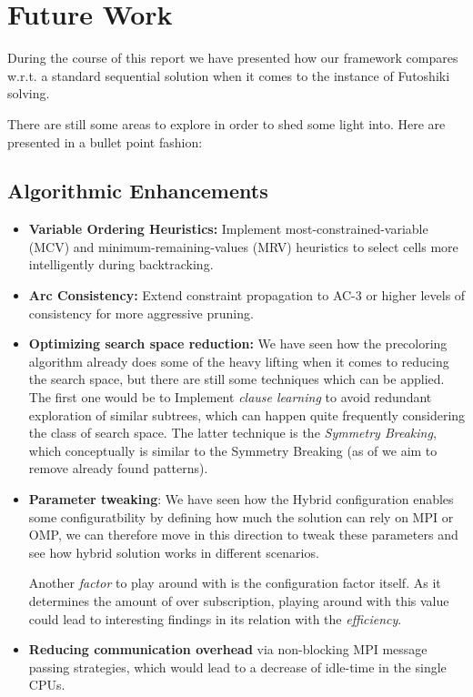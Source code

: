 \section{Future Work}
\label{sec:future_work}
During the course of this report we have presented how our framework compares w.r.t. a standard sequential solution when it comes to the instance of Futoshiki solving. 

There are still some areas to explore in order to shed some light into. Here are presented in a bullet point fashion:

\subsection{Algorithmic Enhancements}
\begin{itemize}
    \item \textbf{Variable Ordering Heuristics:} Implement most-constrained-variable (MCV) and minimum-remaining-values (MRV) heuristics to select cells more intelligently during backtracking.
    
    \item \textbf{Arc Consistency:} Extend constraint propagation to AC-3 or higher levels of consistency for more aggressive pruning.
    
    \item \textbf{Optimizing search space reduction:} We have seen how the precoloring algorithm already does some of the heavy lifting when it comes to reducing the search space, but there are still some techniques which can be applied. The first one would be to  Implement \textit{clause learning} to avoid redundant exploration of similar subtrees, which can happen quite frequently considering the class of search space. The latter technique is the \textit{Symmetry Breaking}, which conceptually is similar to the Symmetry Breaking (as of we aim to remove already found patterns).
    
    \item \textbf{Parameter tweaking}: We have seen how the Hybrid configuration enables some configuratbility by defining how much the solution can rely on MPI or OMP, we can therefore move in this direction to tweak these parameters and see how hybrid solution works in different scenarios.

    Another \textit{factor }to play around with is the configuration factor itself. As it determines the amount of over subscription, playing around with this value could lead to interesting findings in its relation with the \textit{efficiency}.
    \item \textbf{Reducing communication overhead} via non-blocking MPI message passing strategies, which would lead to a decrease of idle-time in the single CPUs.


\end{itemize}
